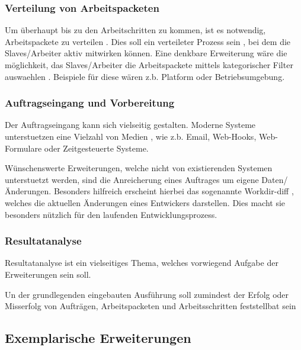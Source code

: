 \subsubsection{Verteilung von Arbeitspacketen}

Um \"uberhaupt bis zu den Arbeitschritten zu kommen,
ist es notwendig, Arbeitspackete zu verteilen .
Dies soll ein verteileter Prozess sein ,
bei dem die Slaves/Arbeiter aktiv mitwirken k\"onnen.
Eine denkbare Erweiterung w\"are die m\"oglichkeit, das Slaves/Arbeiter
die Arbeitspackete mittels kategorischer Filter auswaehlen .
Beispiele f\"ur diese w\"aren z.b. Platform oder Betriebsumgebung.

\subsubsection{Auftragseingang und Vorbereitung}


Der Auftragseingang kann sich vielseitig gestalten.
Moderne Systeme unterstuetzen eine Vielzahl von Medien ,
wie z.b. Email, Web-Hooks, Web-Formulare oder Zeitgesteuerte Systeme.

W\"unschenswerte Erweiterungen, welche nicht von existierenden Systemen unterstuetzt werden,
sind die Anreicherung eines Auftrages um eigene Daten/\"Anderungen.
Besonders hilfreich erscheint hierbei das sogenannte Workdir-diff ,
welches die aktuellen \"Anderungen eines Entwickers darstellen.
Dies macht sie besonders n\"utzlich f\"ur den laufenden Entwicklungsprozess.

\subsubsection{Resultatanalyse}

Resultatanalyse ist ein vielseitiges Thema,
welches vorwiegend Aufgabe der Erweiterungen sein soll.

Un der grundlegenden eingebauten Ausf\"uhrung soll zumindest der Erfolg oder Misserfolg
von Auftr\"agen, Arbeitspacketen und Arbeitsschritten feststellbat sein 


\subsection{Exemplarische Erweiterungen}

